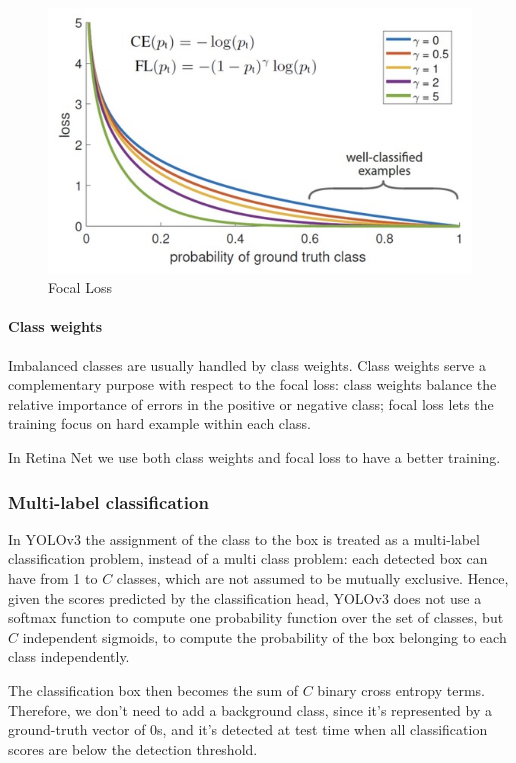 \begin{figure}[htbp]
  \centering
  \includegraphics[width=0.9\linewidth]{./img/focal_loss.jpg}
  \caption{Focal Loss}
\end{figure}

\paragraph{Class weights}
Imbalanced classes are usually handled by class weights.
Class weights serve a complementary purpose with respect to the focal loss: class weights balance the relative importance of errors in the positive or negative class; focal loss lets the training focus on hard example within each class.

In Retina Net we use both class weights and focal loss to have a better training.

\subsubsection{Multi-label classification}
In YOLOv3 the assignment of the class to the box is treated as a multi-label classification problem, instead of a multi class problem: each detected box can have from 1 to $C$ classes, which are not assumed to be mutually exclusive.
Hence, given the scores predicted by the classification head, YOLOv3 does not use a softmax function to compute one probability function over the set of classes, but $C$ independent sigmoids, to compute the probability of the box belonging to each class independently.

The classification box then becomes the sum of $C$ binary cross entropy terms.
Therefore, we don't need to add a background class, since it's represented by a ground-truth vector of 0s, and it's detected at test time when all classification scores are below the detection threshold.

